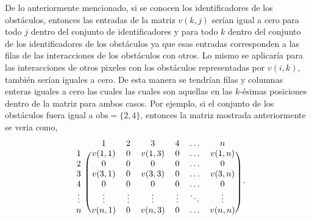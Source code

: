 \begin{enumerate}
\begin{solution}
        De lo anteriormente mencionado, si se conocen los identificadores de los obstáculos, entonces las entradas de la matriz $v(k, j)$ serían igual a cero para todo $j$ dentro del conjunto de identificadores y para todo $k$ dentro del conjunto de los identificadores de los obstáculos ya que esas entradas corresponden a las filas de las interacciones de los obstáculos con otros. Lo mismo se aplicaría para las interacciones de otros pixeles con los obstáculos representadas por $v(i, k)$, también serían iguales a cero. De esta manera se tendrían filas y columnas enteras iguales a cero las cuales las cuales son aquellas en las $k$-ésimas posiciones dentro de la matriz para ambos casos. Por ejemplo, si el conjunto de los obstáculos fuera igual a $\text{obs} = \{2, 4\}$, entonces la matriz mostrada anteriormente se veria como,
        \begin{equation*}
            \begin{blockarray}{c c c c c c c}
                & 1 & 2 & 3 & 4 & \hdots & n \\
                \begin{block}{c (c c c c c c)}
                    1 & v(1,1) & 0 & v(1,3) & 0 & \hdots & v(1,n) \\
                    2 & 0 & 0 & 0 & 0 & \hdots & 0 \\
                    3 & v(3,1) & 0 & v(3,3) & 0 & \hdots & v(3,n) \\
                    4 & 0 & 0 & 0 & 0 & \hdots & 0 \\
                    \vdots & \vdots & \vdots & \vdots & \vdots & \ddots & \vdots \\
                    n & v(n,1) & 0 & v(n,3) & 0 & \hdots & v(n,n) \\
                \end{block}
            \end{blockarray}\ .
            \end{equation*}


\end{solution}
\end{enumerate}
